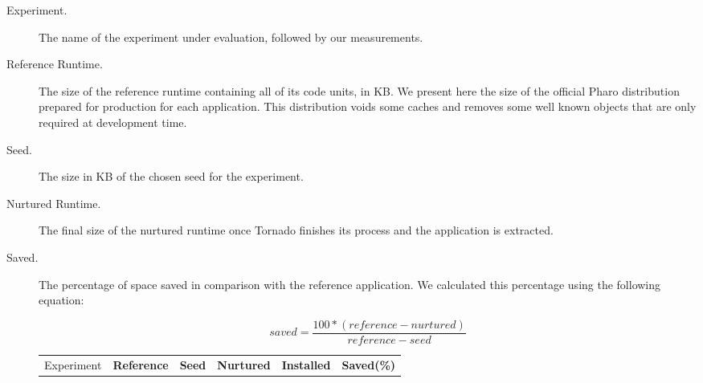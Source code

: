 \begin{description}
\item[Experiment.] The name of the experiment under evaluation, followed by our measurements.
\item[Reference Runtime.] The size of the reference runtime containing all of its code units, in KB. We present here the size of the official Pharo distribution prepared for production for each application. This distribution voids some caches and removes some well known objects that are only required at development time.
\item[Seed.] The size in KB of the chosen seed for the experiment.
\item[Nurtured Runtime.] The final size of the nurtured runtime once Tornado finishes its process and the application is extracted.
\item[Saved.] The percentage of space saved in comparison with the reference application. We calculated this percentage using the following equation:

\begin{equation*}
saved = \frac{100*(reference - nurtured)}{reference - seed}
\end{equation*}

\begin{table}[ht]
 	\centering
 	\begin{tabular}{lccccc}
		\toprule
			Experiment
 			& \textbf{Reference}
			& \textbf{Seed}
			& \textbf{Nurtured}
			& \textbf{Installed}
			& \textbf{Saved(\%)}\\
			

\end{tabular}
\end{table}
\end{description}
